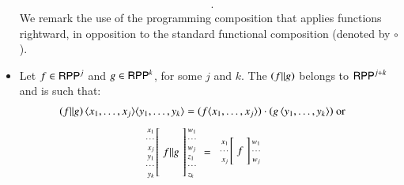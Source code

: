 \begin{definition}
\begin{itemize}
\begin{align*}
\enspace .
\end{align*}
We remark  the use of the programming composition that applies functions rightward, in opposition to the standard 
functional  composition (denoted by $\circ$). 
\item 
Let $ f\in\mathsf{RPP}^{j}$ and $ g\in\mathsf{RPP}^{k}$,
for some $ j $ and $ k $.
The \rprPComName 
$ (f \rVert g)$ belongs to $ \mathsf{RPP}^{j+k} $ and is such that:
\begin{align*}
(f \rVert g) \, 
\langle x_1, \ldots, x_j\rangle
\langle y_1, \ldots, y_k\rangle & =  
(f\langle x_1, \ldots, x_j\rangle)\cdot (g\,\langle y_1, \ldots, y_k\rangle)
\textrm{ or }
\end{align*}
\begin{align*}
\arraycolsep=1.4pt
\begin{array}{rcl}
 \left. {\scriptsize \begin{array}{r} 
                       x_1\\ \cdots\\ x_j\\y_1\\ \cdots\\ y_k
                     \end{array}} \right[
 & \rprPCom{f}{g} &
 \left] {\scriptsize \begin{array}{l}
                       w_1\\ \cdots\\ w_j\\z_1\\ \cdots\\ z_k
                     \end{array} } \right.
\end{array}
& =
\arraycolsep=1.4pt
\begin{array}{c}
 \begin{array}{rcl}
  \left. {\scriptsize \begin{array}{r} 
                        x_1\\ \cdots\\ x_j
                      \end{array}} \right[
  & f &
  \left] {\scriptsize \begin{array}{r} 
                        w_1\\ \cdots\\ w_j
                       \end{array}
         } \right.
 \end{array}
 \vspace{.25em}

\end{array}
\end{align*}
\end{itemize}
\end{definition}
